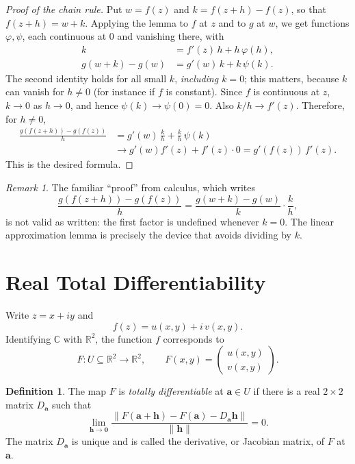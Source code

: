 \documentclass[11pt]{article}
\theoremstyle{plain}
\theoremstyle{definition}
\newtheorem{definition}[theorem]{Definition}
\theoremstyle{remark}
\newtheorem*{remark}{Remark}
\numberwithin{equation}{section}
\newcommand{\be}{\begin{equation}}
\newcommand{\ee}{\end{equation}}
\newcommand{\C}{\mathbb{C}}
\newcommand{\R}{\mathbb{R}}
\begin{document}
\begin{proof}[Proof of the chain rule]
Put $w=f(z)$ and $k=f(z+h)-f(z)$, so that $f(z+h)=w+k$.  Applying the
lemma to $f$ at $z$ and to $g$ at $w$, we get functions $\varphi,\psi$,
each continuous at $0$ and vanishing there, with
\begin{align*}
  k&=f'(z)\,h+h\,\varphi(h),\\
  g(w+k)-g(w)&=g'(w)\,k+k\,\psi(k).
\end{align*}
The second identity holds for all small $k$, \emph{including $k=0$};
this matters, because $k$ can vanish for $h\ne0$ (for instance if $f$ is
constant).  Since $f$ is continuous at $z$, $k\to0$ as $h\to0$, and
hence $\psi(k)\to\psi(0)=0$.  Also $k/h\to f'(z)$.  Therefore, for
$h\ne0$,
\begin{align*}
 \frac{g(f(z+h))-g(f(z))}{h}
 &=g'(w)\,\frac{k}{h}+\frac{k}{h}\,\psi(k)\\
 &\longrightarrow g'(w)f'(z)+f'(z)\cdot0
 = g'(f(z))\,f'(z).
\end{align*}
This is the desired formula.
\end{proof}

\begin{remark}
The familiar ``proof'' from calculus, which writes
\[
  \frac{g(f(z+h))-g(f(z))}{h}
  =\frac{g(w+k)-g(w)}{k}\cdot\frac{k}{h},
\]
is not valid as written: the first factor is undefined whenever $k=0$.
The linear approximation lemma is precisely the device that avoids
dividing by $k$.
\end{remark}

\section{Real Total Differentiability}

Write $z=x+iy$ and
\be
  f(z)=u(x,y)+i\,v(x,y).
\ee
Identifying $\C$ with $\R^2$, the function $f$ corresponds to
\be
  F:U\subseteq\R^2\longrightarrow\R^2,
  \qquad
  F(x,y)=\begin{pmatrix}u(x,y)\\v(x,y)\end{pmatrix}.
\ee

\begin{definition}
The map $F$ is \emph{totally differentiable} at
$\mathbf a\in U$ if there is a real $2\times2$ matrix $D_{\mathbf a}$ such
that
\be
  \lim_{\mathbf h\to\mathbf0}
  \frac{\|F(\mathbf a+\mathbf h)-F(\mathbf a)-D_{\mathbf a}\mathbf h\|}
       {\|\mathbf h\|}=0.
\ee
The matrix $D_{\mathbf a}$ is unique and is called the derivative, or
Jacobian matrix, of $F$ at $\mathbf a$.
\end{definition}
\end{document}
